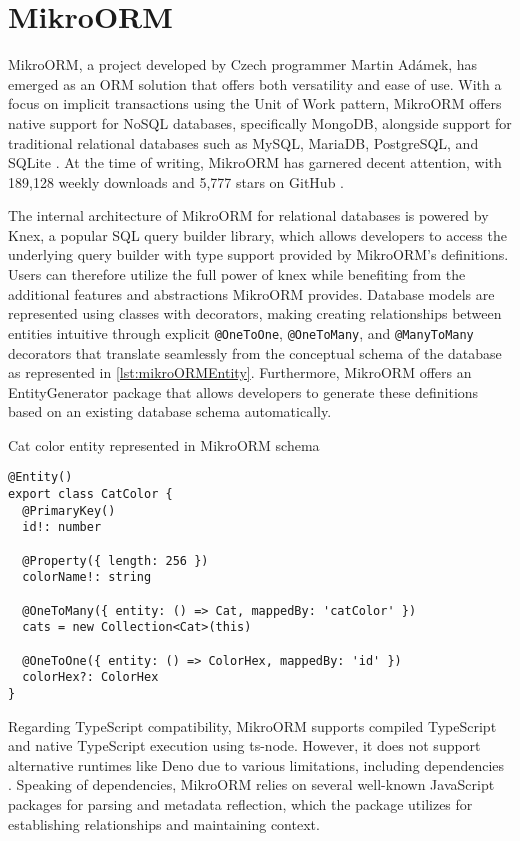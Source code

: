 \section{MikroORM}

MikroORM, a project developed by Czech programmer Martin Adámek, has emerged as
an ORM solution that offers both versatility and ease of use. With a focus on
implicit transactions using the Unit of Work pattern, MikroORM offers native
support for NoSQL databases, specifically MongoDB, alongside support for
traditional relational databases such as MySQL, MariaDB, PostgreSQL, and SQLite
\cite{mikroORMWeb}. At the time of writing, MikroORM has garnered decent
attention, with 189,128 weekly downloads and 5,777 stars on GitHub
\cite{mikroORMGitHub} \cite{mikroORMNpm}.

The internal architecture of MikroORM for relational databases is powered by
Knex, a popular SQL query builder library, which allows developers to access the
underlying query builder with type support provided by MikroORM's definitions.
Users can therefore utilize the full power of knex while benefiting from the
additional features and abstractions MikroORM provides. Database models are
represented using classes with decorators, making creating relationships between
entities intuitive through explicit \texttt{@OneToOne}, \texttt{@OneToMany}, and
\texttt{@ManyToMany} decorators that translate seamlessly from the conceptual
schema of the database as represented in \autoref{lst:mikroORMEntity}.
Furthermore, MikroORM offers an EntityGenerator package that allows developers
to generate these definitions based on an existing database schema
automatically.

\begin{listing}
    \caption{Cat color entity represented in MikroORM schema}
    \label{lst:mikroORMEntity}
    \begin{verbatim}
@Entity()
export class CatColor {
  @PrimaryKey()
  id!: number

  @Property({ length: 256 })
  colorName!: string

  @OneToMany({ entity: () => Cat, mappedBy: 'catColor' })
  cats = new Collection<Cat>(this)

  @OneToOne({ entity: () => ColorHex, mappedBy: 'id' })
  colorHex?: ColorHex
}
    \end{verbatim}
\end{listing}

Regarding TypeScript compatibility, MikroORM supports compiled TypeScript and
native TypeScript execution using ts-node. However, it does not support
alternative runtimes like Deno due to various limitations, including
dependencies \cite{mikroORMDeno}. Speaking of dependencies, MikroORM relies on
several well-known JavaScript packages for parsing and metadata reflection,
which the package utilizes for establishing relationships and maintaining
context.


